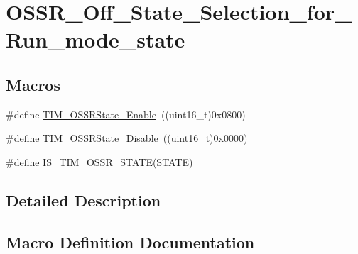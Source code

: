 \hypertarget{group___o_s_s_r___off___state___selection__for___run__mode__state}{}\section{O\+S\+S\+R\+\_\+\+Off\+\_\+\+State\+\_\+\+Selection\+\_\+for\+\_\+\+Run\+\_\+mode\+\_\+state}
\label{group___o_s_s_r___off___state___selection__for___run__mode__state}
\subsection*{Macros}
\begin{DoxyCompactItemize}
\item 
\#define \mbox{\hyperlink{group___o_s_s_r___off___state___selection__for___run__mode__state_ga3703ba6189db045bec48c864289f997e}{T\+I\+M\+\_\+\+O\+S\+S\+R\+State\+\_\+\+Enable}}~((uint16\+\_\+t)0x0800)
\item 
\#define \mbox{\hyperlink{group___o_s_s_r___off___state___selection__for___run__mode__state_ga766dfd8b3c32ec1b8b446f0e2dbe7b97}{T\+I\+M\+\_\+\+O\+S\+S\+R\+State\+\_\+\+Disable}}~((uint16\+\_\+t)0x0000)
\item 
\#define \mbox{\hyperlink{group___o_s_s_r___off___state___selection__for___run__mode__state_ga48b4f15f6346e28087edbb9af2ba4f63}{I\+S\+\_\+\+T\+I\+M\+\_\+\+O\+S\+S\+R\+\_\+\+S\+T\+A\+TE}}(S\+T\+A\+TE)
\end{DoxyCompactItemize}


\subsection{Detailed Description}


\subsection{Macro Definition Documentation}
\mbox{\label{group___o_s_s_r___off___state___selection__for___run__mode__state_ga48b4f15f6346e28087edbb9af2ba4f63}} 
